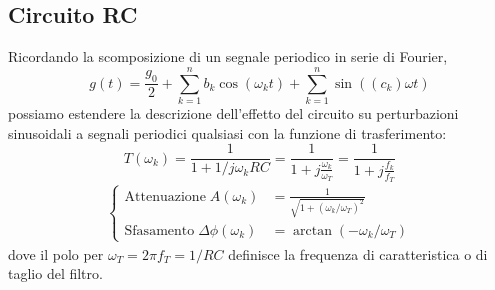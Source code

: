 \documentclass{article}[a4paper, oneside, 11pt]
\begin{document}
\subsection{Circuito RC}
Ricordando la scomposizione di un segnale periodico in serie di Fourier,
\begin{equation}
g(t) = \frac{g_0}{2} + \sum_{k=1}^{n} b_k \cos{(\omega_kt)} + 
\sum_{k=1}^{n} \sin{\left((c_k)\omega t\right)}
\end{equation}
possiamo estendere la descrizione dell'effetto del circuito su perturbazioni
sinusoidali a segnali periodici qualsiasi con la funzione di trasferimento:
\begin{equation}
	T(\omega_k) = \frac{1}{1 + 1/j\omega_k RC} = 
	\frac{1}{1 + j\frac{\omega_k}{\omega_T}} = \frac{1}{1 + j\frac{f_k}{f_T}}
\end{equation}
\begin{align*}\label{eq:fin}
\begin{cases}
	\mathrm{Attenuazione} \; A(\omega_k) &=
	\frac{1}{\sqrt{1 + \left(\omega_k/\omega_T \right)^2}} \\
	\mathrm{Sfasamento} \; \Delta \phi(\omega_k) &=
	\arctan{\left(- \omega_k /\omega_T \right)}
\end{cases}
\end{align*}
dove il polo per $\omega_T = 2\pi f_T = 1/RC$ definisce la frequenza di
caratteristica o di taglio del filtro.
\medskip
\end{document}
